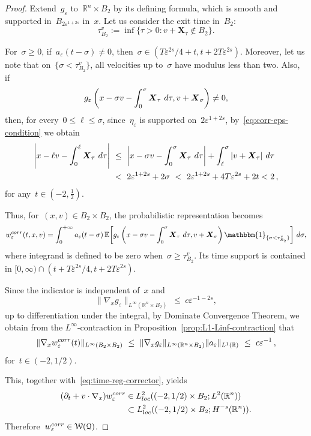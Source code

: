 \documentclass[leqno,10pt]{amsart}
\theoremstyle{plain}
\theoremstyle{remark}
\numberwithin{equation}{section}
\def \d{\,{\rm d}}
\def\er{\mathbb{R}}
\def\ern{\mathbb{R}^n}
\newcommand{\Wc}{\mathcal{W}}
\newcommand{\Xb}{\boldsymbol{X}}
\newcommand{\eps}{\varepsilon}
\begin{document}
{\begin{proof}
Extend~$g_\eps$ to~$\ern\times B_2$ by
its defining formula, which is smooth and supported in~$B_{2\eps^{1+2s}}$ in~$x$. Let us consider the exit time in~$B_2$:
\[
\tau_{B_2}^{v}:=\inf\{\tau>0:v+\Xb_{\tau}\notin B_2\}.
\]


For~$\sigma\geq0$, if~$a_\eps(t-\sigma)\neq0$, then~$\sigma \in (T\eps^{2s}/4+t,t+2T\eps^{2s})$. Moreover, let us note that on~$\{\sigma<\tau_{B_2}^{v}\}$, all velocities up to~$\sigma$ have modulus less than two. Also, if
\[
g_\eps\left(x-\sigma{}v-\int_0^{\sigma}\Xb_\tau\,\d\tau,
             v+\Xb_{\sigma}\right)\neq0,
\]
then, for every~$0\leq\ell\leq \sigma$, since~$\eta_\eps$ is supported on~$2\eps^{1+2s}$, by~\eqref{eq:corr-eps-condition} we obtain
\[
\begin{aligned}
\left|x-\ell v-\int_0^\ell\Xb_\tau\,\d\tau\right|
&\ \leq\
\left|x-\sigma{}v-\int_0^{\sigma}\Xb_\tau\,\d\tau\right|
 +\int_\ell^{\sigma}|v+\Xb_\tau|\,\d\tau\\
&\ <\ 2\eps^{1+2s}+2\sigma
\ <\ 2\eps^{1+2s}+4T\eps^{2s} + 2t<2\,,
\end{aligned}
\]
for any~$t \in (-2,\frac{1}{2})$.

Thus, for~$(x,v)\in B_2\times B_2$, the probabilistic representation becomes
\[
w_\eps^{\rm corr}(t,x,v)
=\int_0^{+\infty}a_\eps(t-\sigma)\,
\mathbb{E}\!\left[
 g_\eps\left(x-\sigma{}v-\int_0^{\sigma}\Xb_\tau\,\d\tau,
             v+\Xb_{\sigma}\right)
 \mathbbm{1}_{\{\sigma<\tau_{B_2}^{v}\}}
\right]\d \sigma,
\]
where integrand is defined to be zero when~$\sigma\geq\tau_{B_2}^v$.
Its time support is contained in
$[0,\infty)\cap(t+T\eps^{2s}/4,t+2T\eps^{2s})$.

Since the indicator is independent of~$x$ and
\[
\|\nabla_xg_\eps\|_{L^\infty(\ern\times B_2)}
\ \leq\ c\eps^{-1-2s},
\]
up to differentiation under the integral, by Dominate Convergence Theorem, we obtain from the $L^\infty$-contraction in Proposition~\ref{prop:L1-Linf-contraction} that
\[
\|\nabla_xw_\eps^{\rm corr}(t)\|_{L^\infty(B_2\times B_2)}
\ \leq\ \|\nabla_xg_\eps\|_{L^\infty(\ern\times B_2)}
 \|a_\eps\|_{L^1(\er)}\ \leq\ c\eps^{-1}\,,
\]
for~$t \in (-2,1/2)$.

This, together with~\eqref{eq:time-reg-corrector}, yields
\[
\begin{aligned}
(\partial_t+v\cdot\nabla_x)w_\eps^{\rm corr}
&\in L^2_{\rm loc}((-2,1/2)\times B_2;L^2(\ern))\\
&\subset L^2_{\rm loc}((-2,1/2)\times B_2;H^{-s}(\ern)).
\end{aligned}
\]
Therefore~$w_\eps^{\rm corr}\in\Wc(\mathcal{Q})$.






\end{proof}}
\end{document}
